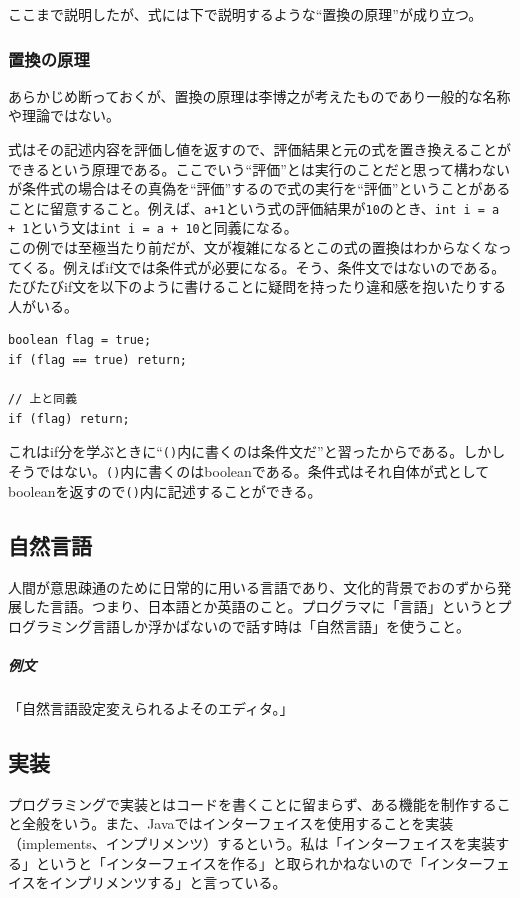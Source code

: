 \documentclass[dvipdfmx,jb5]{jreport}
\newcommand{\terlogy}[2][|]{\colorbox{terlogy}{\texttt{\lstinline#1#2#1}}}
\begin{document}
ここまで説明したが、式には下で説明するような``置換の原理''が成り立つ。

\subsubsection{置換の原理}
あらかじめ断っておくが、置換の原理は李博之が考えたものであり一般的な名称や理論ではない。\par
式はその記述内容を評価し値を返すので、評価結果と元の式を置き換えることができるという原理である。ここでいう``評価''とは実行のことだと思って構わないが条件式の場合はその真偽を``評価''するので式の実行を``評価''ということがあることに留意すること。例えば、\terlogy{a+1}という式の評価結果が\terlogy{10}のとき、\terlogy{int i = a + 1}という文は\terlogy{int i = a + 10}と同義になる。
\\

この例では至極当たり前だが、文が複雑になるとこの式の置換はわからなくなってくる。例えばif文では条件式が必要になる。そう、条件文ではないのである。たびたびif文を以下のように書けることに疑問を持ったり違和感を抱いたりする人がいる。

\lstset{language=C}
\begin{lstlisting}
boolean flag = true;
if (flag == true) return;

// 上と同義
if (flag) return;
\end{lstlisting}

これはif分を学ぶときに``\terlogy{()}内に書くのは条件文だ''と習ったからである。しかしそうではない。\terlogy{()}内に書くのはbooleanである。条件式はそれ自体が式としてbooleanを返すので\terlogy{()}内に記述することができる。

\subsection{自然言語}
人間が意思疎通のために日常的に用いる言語であり、文化的背景でおのずから発展した言語。つまり、日本語とか英語のこと。プログラマに「言語」というとプログラミング言語しか浮かばないので話す時は「自然言語」を使うこと。

\subparagraph{例文}「自然言語設定変えられるよそのエディタ。」

\subsection{実装}
プログラミングで実装とはコードを書くことに留まらず、ある機能を制作すること全般をいう。また、Javaではインターフェイスを使用することを実装（implements、インプリメンツ）するという。私は「インターフェイスを実装する」というと「インターフェイスを作る」と取られかねないので「インターフェイスをインプリメンツする」と言っている。
\end{document}
